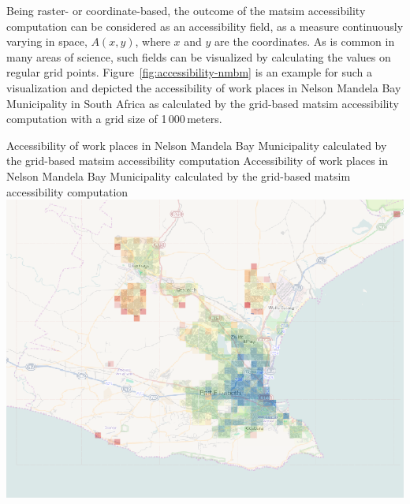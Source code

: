 Being raster- or coordinate-based, the outcome of the \gls{matsim} accessibility computation can be
considered as an accessibility field, \ie as a measure continuously varying in space, $A(x,y)$, where 
$x$ and $y$ are the coordinates. As is common in many areas of science, such fields can be visualized 
by calculating the values on regular grid points. Figure~\ref{fig:accessibility-nmbm} is an example for 
such a visualization and depicted the accessibility of work places in Nelson Mandela Bay Municipality 
in South Africa as calculated by the grid-based \gls{matsim} accessibility computation with a grid size 
of 1\,000\,meters.


%

\createfigure%
{Accessibility of work places in Nelson Mandela Bay Municipality calculated
	by the grid-based \gls{matsim} accessibility computation}%
{Accessibility of work places in Nelson Mandela Bay Municipality calculated
	by the grid-based \gls{matsim} accessibility computation}%
{\label{fig:accessibility-nmbm}}%
{\includegraphics[width=0.99\hsize]{extending/figures/accessibility/w_freeSpeed_snapshot.png}}%
{}

